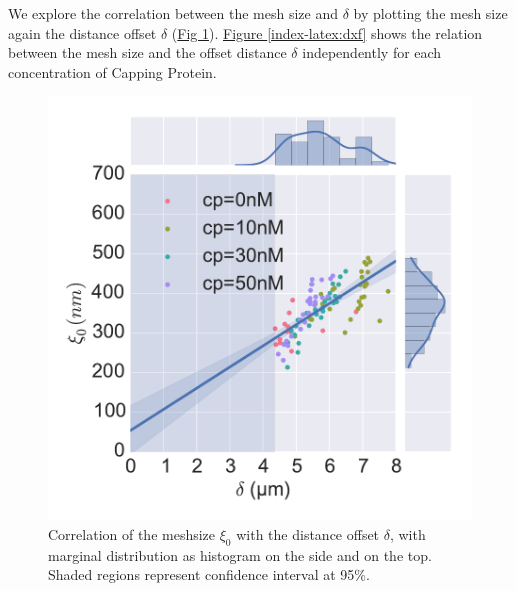 \documentclass[A4paperpaper,11pt,english]{sphinxmanual}
\begin{document}
We explore the correlation between the mesh size and \(\delta\) by plotting  the mesh size again the distance offset \(\delta\) (\hyperref[index-latex:dxcf]{Fig  \ref*{index-latex:dxcf}}).
\hyperref[index-latex:dxf]{Figure  \ref*{index-latex:dxf}} shows the relation between the mesh size and the offset
distance \(\delta\) independently for each concentration of Capping Protein.
\begin{figure}[htbp]
\centering
\capstart

\includegraphics[width=1.000\linewidth]{delta-xi-corr.pdf}
\caption{Correlation of the meshsize \(\xi_0\) with the distance offset \(\delta\),
with marginal distribution as histogram on the side and on the top.  Shaded
regions represent confidence interval at 95\%.}\label{index-latex:dxcf}\end{figure}
\end{document}
